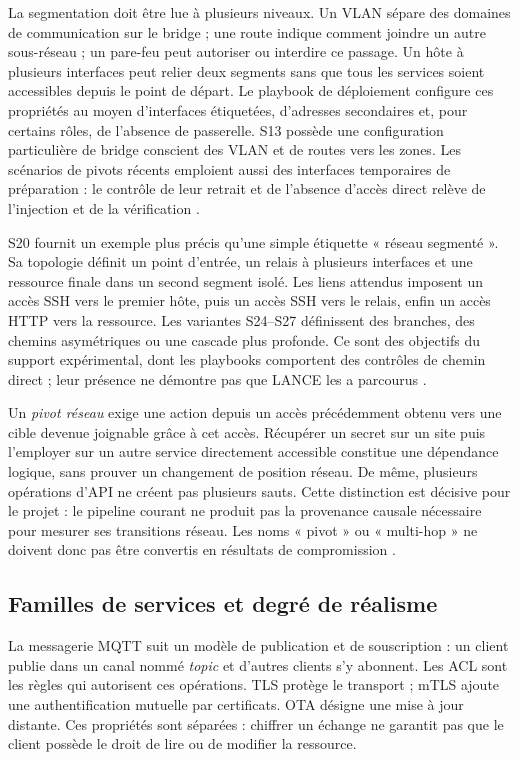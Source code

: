 \documentclass[11pt,a4paper]{article}
\begin{document}
La segmentation doit être lue à plusieurs niveaux. Un VLAN sépare des domaines
de communication sur le bridge ; une route indique comment joindre un autre
sous-réseau ; un pare-feu peut autoriser ou interdire ce passage. Un hôte à
plusieurs interfaces peut relier deux segments sans que tous les services soient
accessibles depuis le point de départ. Le playbook de déploiement configure
ces propriétés au moyen d'interfaces étiquetées, d'adresses secondaires et,
pour certains rôles, de l'absence de passerelle. S13 possède une configuration
particulière de bridge conscient des VLAN et de routes vers les zones. Les
scénarios de pivots récents emploient aussi des interfaces temporaires de
préparation : le contrôle de leur retrait et de l'absence d'accès direct relève
de l'injection et de la vérification \cite{net-deploy,net-verify}.

S20 fournit un exemple plus précis qu'une simple étiquette « réseau segmenté ».
Sa topologie définit un point d'entrée, un relais à plusieurs interfaces et une
ressource finale dans un second segment isolé. Les liens attendus imposent un
accès SSH vers le premier hôte, puis un accès SSH vers le relais, enfin un accès
HTTP vers la ressource. Les variantes S24--S27 définissent des branches, des
chemins asymétriques ou une cascade plus profonde. Ce sont des objectifs du
support expérimental, dont les playbooks comportent des contrôles de chemin
direct ; leur présence ne démontre pas que LANCE les a parcourus
\cite{net-topology,net-verify}.

Un \emph{pivot réseau} exige une action depuis un accès précédemment obtenu
vers une cible devenue joignable grâce à cet accès. Récupérer un secret sur un
site puis l'employer sur un autre service directement accessible constitue une
dépendance logique, sans prouver un changement de position réseau. De même,
plusieurs opérations d'API ne créent pas plusieurs sauts. Cette distinction
est décisive pour le projet : le pipeline courant ne produit pas la provenance
causale nécessaire pour mesurer ses transitions réseau. Les noms « pivot » ou
« multi-hop » ne doivent donc pas être convertis en résultats de compromission
\cite{net-attacks}.

\subsection{Familles de services et degré de réalisme}

La messagerie MQTT suit un modèle de publication et de souscription : un
client publie dans un canal nommé \emph{topic} et d'autres clients s'y abonnent.
Les ACL sont les règles qui autorisent ces opérations. TLS protège le
transport ; mTLS ajoute une authentification mutuelle par certificats.
OTA désigne une mise à jour distante. Ces propriétés sont séparées : chiffrer
un échange ne garantit pas que le client possède le droit de lire ou de modifier
la ressource.
\end{document}
